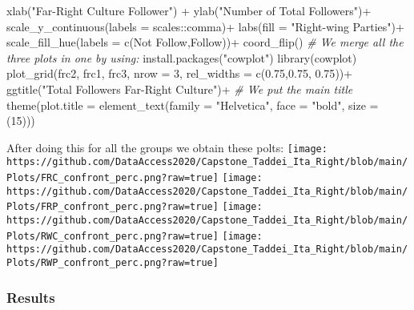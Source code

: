 \documentclass[
]{article}
\newenvironment{Shaded}{\begin{snugshade}}{\end{snugshade}}
\newcommand{\AttributeTok}[1]{\textcolor[rgb]{0.77,0.63,0.00}{#1}}
\newcommand{\CommentTok}[1]{\textcolor[rgb]{0.56,0.35,0.01}{\textit{#1}}}
\newcommand{\DecValTok}[1]{\textcolor[rgb]{0.00,0.00,0.81}{#1}}
\newcommand{\FloatTok}[1]{\textcolor[rgb]{0.00,0.00,0.81}{#1}}
\newcommand{\FunctionTok}[1]{\textcolor[rgb]{0.00,0.00,0.00}{#1}}
\newcommand{\NormalTok}[1]{#1}
\newcommand{\SpecialCharTok}[1]{\textcolor[rgb]{0.00,0.00,0.00}{#1}}
\newcommand{\StringTok}[1]{\textcolor[rgb]{0.31,0.60,0.02}{#1}}
\begin{document}
\begin{Shaded}
\begin{Highlighting}[]
  \FunctionTok{xlab}\NormalTok{(}\StringTok{"Far{-}Right Culture Follower"}\NormalTok{) }\SpecialCharTok{+}
  \FunctionTok{ylab}\NormalTok{(}\StringTok{"Number of Total Followers"}\NormalTok{)}\SpecialCharTok{+}
  \FunctionTok{scale\_y\_continuous}\NormalTok{(}\AttributeTok{labels =}\NormalTok{ scales}\SpecialCharTok{::}\NormalTok{comma)}\SpecialCharTok{+}
  \FunctionTok{labs}\NormalTok{(}\AttributeTok{fill =} \StringTok{"Right{-}wing Parties"}\NormalTok{)}\SpecialCharTok{+}
  \FunctionTok{scale\_fill\_hue}\NormalTok{(}\AttributeTok{labels =} \FunctionTok{c}\NormalTok{(}\StringTok{\textquotesingle{}Not Follow\textquotesingle{}}\NormalTok{,}\StringTok{\textquotesingle{}Follow\textquotesingle{}}\NormalTok{))}\SpecialCharTok{+}
  \FunctionTok{coord\_flip}\NormalTok{()}
\CommentTok{\# We merge all the three plots in one by using:}
\FunctionTok{install.packages}\NormalTok{(}\StringTok{"cowplot"}\NormalTok{)}
\FunctionTok{library}\NormalTok{(cowplot)}
\FunctionTok{plot\_grid}\NormalTok{(frc2, frc1, frc3, }\AttributeTok{nrow =} \DecValTok{3}\NormalTok{, }\AttributeTok{rel\_widths =} \FunctionTok{c}\NormalTok{(}\FloatTok{0.75}\NormalTok{,}\FloatTok{0.75}\NormalTok{, }\FloatTok{0.75}\NormalTok{))}\SpecialCharTok{+}
  \FunctionTok{ggtitle}\NormalTok{(}\StringTok{"Total Followers Far{-}Right Culture"}\NormalTok{)}\SpecialCharTok{+} \CommentTok{\# We put the main title}
  \FunctionTok{theme}\NormalTok{(}\AttributeTok{plot.title =} \FunctionTok{element\_text}\NormalTok{(}\AttributeTok{family =} \StringTok{"Helvetica"}\NormalTok{, }\AttributeTok{face =} \StringTok{"bold"}\NormalTok{, }\AttributeTok{size =}\NormalTok{ (}\DecValTok{15}\NormalTok{)))}
\end{Highlighting}
\end{Shaded}

After doing this for all the groups we obtain these polts:
\texttt{[image: https://github.com/DataAccess2020/Capstone\_Taddei\_Ita\_Right/blob/main/Plots/FRC\_confront\_perc.png?raw=true]}
\texttt{[image: https://github.com/DataAccess2020/Capstone\_Taddei\_Ita\_Right/blob/main/Plots/FRP\_confront\_perc.png?raw=true]}
\texttt{[image: https://github.com/DataAccess2020/Capstone\_Taddei\_Ita\_Right/blob/main/Plots/RWC\_confront\_perc.png?raw=true]}
\texttt{[image: https://github.com/DataAccess2020/Capstone\_Taddei\_Ita\_Right/blob/main/Plots/RWP\_confront\_perc.png?raw=true]}

\hypertarget{results}{%
\subsubsection{Results}\label{results}}
\end{document}
